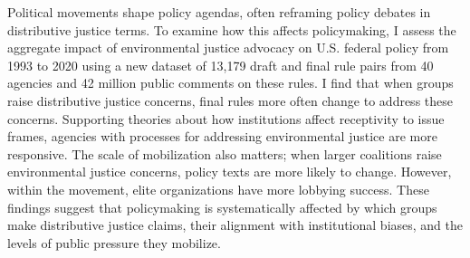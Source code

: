 Political movements shape policy agendas, often reframing policy debates in distributive justice terms.  To examine how this affects policymaking, I assess the aggregate impact of environmental justice advocacy on U.S. federal policy from 1993 to 2020 using a new dataset of 13,179 draft and final rule pairs from 40 agencies and 42 million public comments on these rules. I find that when groups raise distributive justice concerns, final rules more often change to address these concerns. Supporting theories about how institutions affect receptivity to issue frames, agencies with processes for addressing environmental justice are more responsive. The scale of mobilization also matters; when larger coalitions raise environmental justice concerns, policy texts are more likely to change. However, within the movement, elite organizations have more lobbying success. These findings suggest that policymaking is systematically affected by which groups make distributive justice claims, their alignment with institutional biases, and the levels of public pressure they mobilize. 
